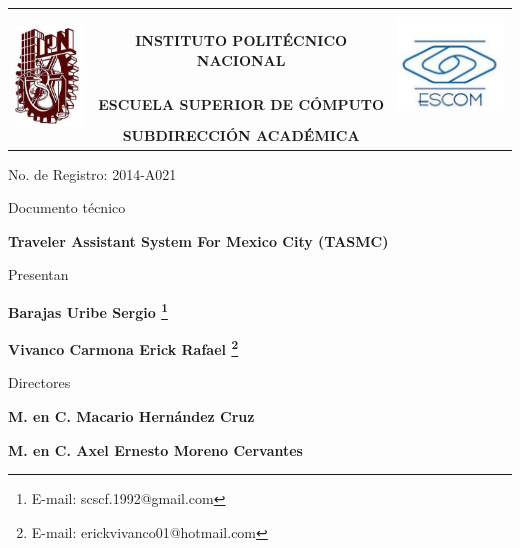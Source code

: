 \thispagestyle{empty}

\begin{center}
	\begin{tabular}{lcl}
		\multirow{5}{*}{\includegraphics[height=3cm]{portada/ipn.jpg}} &
		&
      	\multirow{3}{*}{\includegraphics[height=2.8cm]{portada/escom.jpg}}\\
      	& \large \bf INSTITUTO POLITÉCNICO NACIONAL & \\
      	& \large \bf ESCUELA SUPERIOR DE CÓMPUTO &\\
      	& \large \bf SUBDIRECCIÓN ACADÉMICA &
	\end{tabular}
\end{center}

\vspace{0.5cm}

\centerline{\large No. de Registro: 2014-A021}
\centerline{\large Documento técnico}

\vspace{0.8cm}

\centerline{\Large \bf Traveler Assistant System For Mexico City (TASMC)}

\vspace{0.8cm}

\centerline{\large Presentan}

\vspace{0.3cm}

\centerline{\large \bf Barajas Uribe Sergio \footnote{E-mail: scscf.1992@gmail.com}}
\centerline{\large \bf Vivanco Carmona Erick Rafael \footnote{E-mail: erickvivanco01@hotmail.com}}

\vspace{0.5cm}

\centerline{\large Directores}

\vspace{0.3cm}

\centerline{\large \bf M. en C. Macario Hernández Cruz}
\centerline{\large \bf M. en C. Axel Ernesto Moreno Cervantes}

